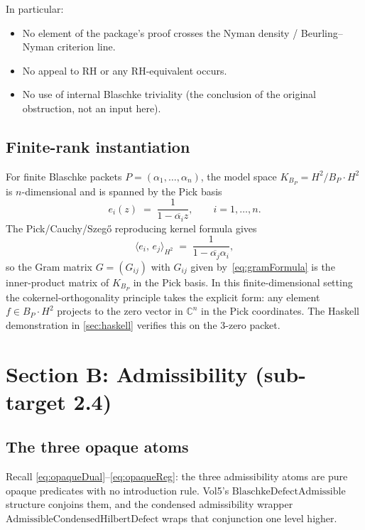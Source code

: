 \documentclass[12pt]{article}
\theoremstyle{definition}
\theoremstyle{remark}
\newcommand{\HardyTwo}{H^{2}}
\newcommand{\BS}{B}
\newcommand{\KBP}{K_{B_{P}}}
\newcommand{\C}{\mathbb{C}}
\newcommand{\inn}[2]{\langle #1,\, #2 \rangle}
\begin{document}
In particular:
\begin{itemize}
  \item No element of the package's proof crosses the Nyman density / Beurling--Nyman criterion line.
  \item No appeal to RH or any RH-equivalent occurs.
  \item No use of internal Blaschke triviality (the conclusion of the original obstruction, not an input here).
\end{itemize}

\subsection{Finite-rank instantiation}\label{subsec:finiteRankCokernel}

For finite Blaschke packets $P = (\alpha_{1}, \dots, \alpha_{n})$, the model space $\KBP = \HardyTwo / \BS_{P} \cdot \HardyTwo$ is $n$-dimensional and is spanned by the Pick basis
\begin{equation}\label{eq:pickBasis}
  e_{i}(z) \;=\; \frac{1}{1 - \overline{\alpha_{i}} z}, \qquad i = 1, \dots, n.
\end{equation}
The Pick/Cauchy/Szeg\H{o} reproducing kernel formula gives
\begin{equation}\label{eq:gramFormula}
  \inn{e_{i}}{e_{j}}_{H^{2}} \;=\; \frac{1}{1 - \overline{\alpha_{j}} \alpha_{i}},
\end{equation}
so the Gram matrix $G = (G_{ij})$ with $G_{ij}$ given by~\eqref{eq:gramFormula} is the inner-product matrix of $\KBP$ in the Pick basis. In this finite-dimensional setting the cokernel-orthogonality principle takes the explicit form: any element $f \in \BS_{P} \cdot \HardyTwo$ projects to the zero vector in $\C^{n}$ in the Pick coordinates. The Haskell demonstration in \cref{sec:haskell} verifies this on the 3-zero packet.

\section{Section B: Admissibility (sub-target 2.4)}\label{sec:admissibility}

\subsection{The three opaque atoms}

Recall \eqref{eq:opaqueDual}--\eqref{eq:opaqueReg}: the three admissibility atoms are pure opaque predicates with no introduction rule. Vol5's $\mathrm{BlaschkeDefectAdmissible}$ structure conjoins them, and the condensed admissibility wrapper $\mathrm{AdmissibleCondensedHilbertDefect}$ wraps that conjunction one level higher.
\end{document}
